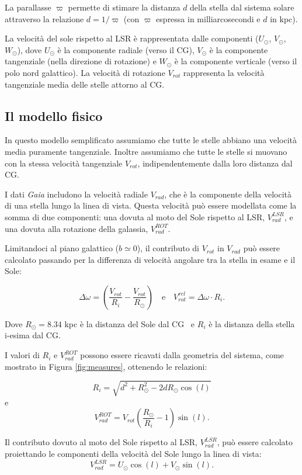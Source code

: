 \documentclass[twocolumn]{article}
\begin{document}
La parallasse $\varpi$ permette di stimare la distanza $d$ della stella dal sistema solare attraverso la relazione $d = 1/\varpi$ (con $\varpi$ espressa in milliarcosecondi e $d$ in kpc).

La velocità del sole rispetto al LSR è rappresentata dalle componenti ($U_\odot$, $V_\odot$, $W_\odot$), dove $U_\odot$ è la componente radiale (verso il CG), $V_\odot$ è la componente tangenziale (nella direzione di rotazione) e $W_\odot$ è la componente verticale (verso il polo nord galattico). La velocità di rotazione $V_{rot}$ rappresenta la velocità tangenziale media delle stelle attorno al CG.


\subsection{Il modello fisico}

In questo modello semplificato assumiamo che tutte le stelle abbiano una velocità media puramente tangenziale. Inoltre assumiamo che tutte le stelle si muovano con la stessa velocità tangenziale $V_{rot}$, indipendentemente dalla loro distanza dal CG.

I dati {\it Gaia} includono la velocità radiale $V_{rad}$, che è la componente della velocità di una stella lungo la linea di vista. Questa velocità può essere modellata come la somma di due componenti: una dovuta al moto del Sole rispetto al LSR, $V_{rad}^{LSR}$, e una dovuta alla rotazione della galassia, $V_{rad}^{ROT}$. 

Limitandoci al piano galattico ($b\simeq 0$), il contributo di $V_{rot}$ in $V_{rad}$ può essere calcolato passando per la differenza di velocità angolare tra la stella in esame e il Sole:

\[ \Delta\omega = \left(\frac{V_{rot}}{R_i} - \frac{V_{rot}}{R_\odot}\right) \quad \text{e} \quad V_{rot}^{rel} = \Delta\omega \cdot R_i. \]

Dove $R_\odot= 8.34$ kpc è la distanza del Sole dal CG~\cite{Reid_2014} e $R_i$ è la distanza della stella i-esima dal CG.

I valori di $R_i$ e $V_{rad}^{ROT}$ possono essere ricavati dalla geometria del sistema, come mostrato in Figura \ref{fig:measures}, ottenendo le relazioni:

\[ R_i = \sqrt{d^2+R_\odot^2 - 2dR_\odot\cos(l)} \] e
\[ V_{rad}^{ROT} = V_{rot} \left( \frac{R_\odot}{R_i} - 1 \right) \sin(l). \]

Il contributo dovuto al moto del Sole rispetto al LSR, $V_{rad}^{LSR}$, può essere calcolato proiettando le componenti della velocità del Sole lungo la linea di vista:
\[ V_{rad}^{LSR} = U_\odot \cos(l) + V_\odot \sin(l). \]
\end{document}
